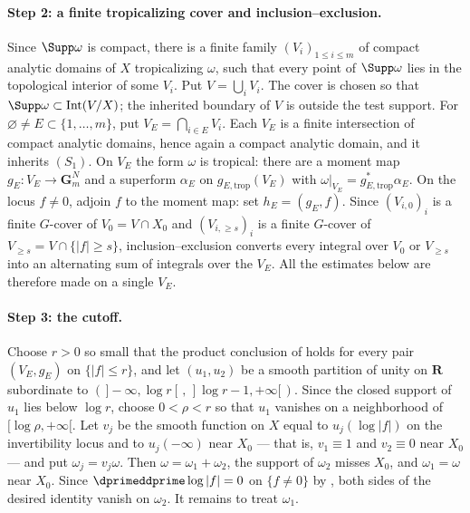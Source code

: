\paragraph{Step 2: a finite tropicalizing cover and inclusion--exclusion.}
Since $\Supp\omega$ is compact, there is a finite family $(V_i)_{1\le i\le m}$
of compact analytic domains of $X$ tropicalizing $\omega$, such that every
point of $\Supp\omega$ lies in the topological interior of some $V_i$.  Put
$V=\bigcup_iV_i$. The cover is chosen so that
$\Supp\omega\subset\operatorname{Int}(V/X)$; the inherited boundary of
$V$ is outside the test support. For
$\varnothing\neq E\subset\{1,\dots,m\}$, put
$V_E=\bigcap_{i\in E}V_i$.  Each $V_E$ is a finite intersection of compact
analytic domains, hence again a compact analytic domain, and it inherits
$(S_1)$.  On $V_E$ the form $\omega$ is tropical: there are a moment map
$g_E:V_E\to\mathbf G_m^{N}$ and a superform $\alpha_E$ on
$g_{E,\mathrm{trop}}(V_E)$ with $\omega|_{V_E}=g_{E,\mathrm{trop}}^*\alpha_E$.
On the locus $f\ne0$, adjoin $f$ to the moment map: set $h_E=(g_E,f)$.
Since $(V_{i,0})_i$ is a finite $G$-cover of
$V_0=V\cap X_0$ and $(V_{i,\ge s})_i$ is a finite $G$-cover of
$V_{\ge s}=V\cap\{|f|\ge s\}$, inclusion--exclusion converts every integral
over $V_0$ or $V_{\ge s}$ into an alternating sum of integrals over the
$V_E$.  All the estimates below are therefore made on a single $V_E$.

\paragraph{Step 3: the cutoff.}
Choose $r>0$ so small that the product conclusion of
 holds for every pair $(V_E,g_E)$ on
$\{|f|\le r\}$, and let $(u_1,u_2)$ be a smooth partition of unity on
$\mathbf R$ subordinate to
$(\,]-\infty,\log r[\,,\,]\log r-1,+\infty[\,)$. Since the closed support
of $u_1$ lies below $\log r$, choose $0<\rho<r$ so that $u_1$ vanishes
on a neighborhood of $[\log\rho,+\infty[$. Let $v_j$ be the smooth
function on $X$ equal to $u_j(\log|f|)$ on the invertibility locus and to
$u_j(-\infty)$ near $X_0$ --- that is, $v_1\equiv1$ and $v_2\equiv0$ near
$X_0$ --- and put $\omega_j=v_j\omega$.  Then $\omega=\omega_1+\omega_2$,
the support of $\omega_2$ misses $X_0$, and $\omega_1=\omega$ near $X_0$.
Since $\dprimeddprime\log|f|=0$ on $\{f\neq0\}$ by
, both sides of the desired identity vanish on
$\omega_2$.  It remains to treat $\omega_1$.

